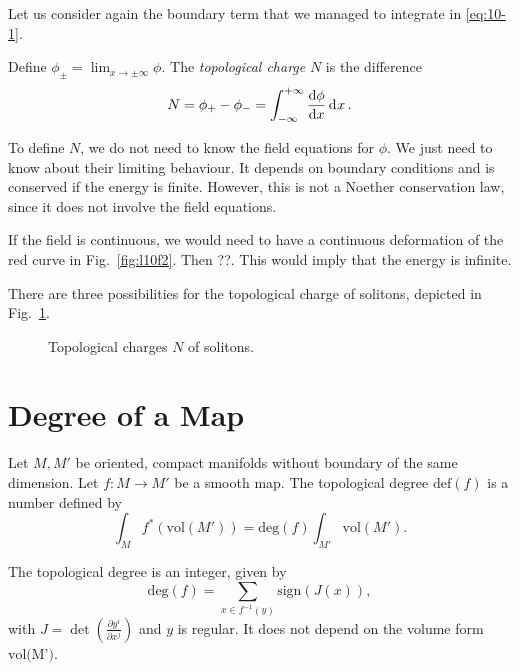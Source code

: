 Let us consider again the boundary term that we managed to integrate in \eqref{eq:10-1}.
\begin{definition}
  Define $\phi_{\pm} = \lim_{x \to \pm \infty}\phi$. The \emph{topological charge} $N$ is the difference
  \begin{equation}
    N = \phi_+ - \phi_- = \int_{-\infty}^{+\infty} \dv{\phi}{x} \dd[]{x}.
  \end{equation}
\end{definition}

To define $N$, we do not need to know the field equations for $\phi$. We just need to know about their limiting behaviour.
It depends on boundary conditions and is conserved if the energy is finite.
However, this is not a Noether conservation law, since it does not involve the field equations.

If the field is continuous, we would need to have a continuous deformation of the red curve in Fig.~\ref{fig:l10f2}. Then ??.
This would imply that the energy is infinite.

There are three possibilities for the topological charge of solitons, depicted in Fig.~\ref{fig:l10f3}.
\begin{figure}[ht]
    \centering
    \caption{Topological charges $N$ of solitons.}
    \label{fig:l10f3}
\end{figure}

\section{Degree of a Map}%
\label{sec:degree_of_a_map}

\begin{definition}
  Let $M, M'$ be oriented, compact manifolds without boundary of the same dimension.
  Let $f \colon M \to M'$ be a smooth map.
  The topological degree $\text{def}(f)$ is a number defined by
  \begin{equation}
    \label{eq:10-deg}
    \int_M f^* (\text{vol}(M')) = \text{deg}(f) \int_{M'} \text{vol}(M').
  \end{equation}
\end{definition}

\begin{theorem}[]
  The topological degree is an integer, given by
  \begin{equation}
    \text{deg}(f) = \sum_{x \in f^{-1}(y)} \text{sign} (J(x)),
  \end{equation}
  with $J = \det(\frac{\partial y^{i}}{\partial x^{j}})$ and $y$ is regular.
  It does not depend on the volume form $\text{vol(M')}$.
\end{theorem}

